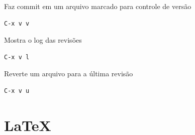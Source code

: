 \documentclass[12pt,brazil]{book}
\begin{document}
Faz commit em um arquivo marcado para controle de versão
\begin{verbatim}                                                                                                 
C-x v v                                                                                                          
\end{verbatim}

Mostra o log das revisões
\begin{verbatim}                                                                                                
C-x v l                                                                                                       
\end{verbatim}

Reverte um arquivo para a última revisão                                             
\begin{verbatim}                                                                                                 
C-x v u                                                                                                          
\end{verbatim}

\chapter{LaTeX}
\label{cha:latex}
\end{document}
